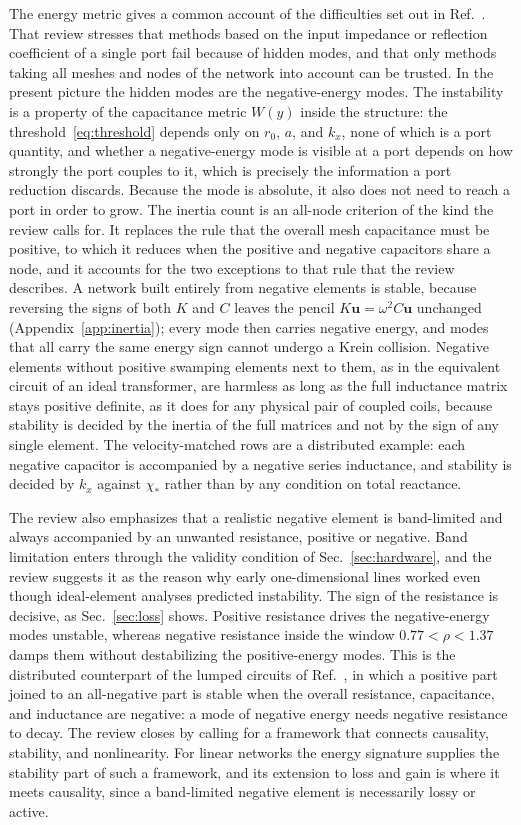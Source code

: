 \documentclass[aps,prapplied,twocolumn,superscriptaddress,floatfix,longbibliography]{revtex4-2}
\begin{document}
The energy metric gives a common account of the difficulties set out in Ref.~\cite{Hrabar_2018:EPJAM}. That review stresses that methods based on the input impedance or reflection coefficient of a single port fail because of hidden modes, and that only methods taking all meshes and nodes of the network into account can be trusted. In the present picture the hidden modes are the negative-energy modes. The instability is a property of the capacitance metric $W(y)$ inside the structure: the threshold~\eqref{eq:threshold} depends only on $r_0$, $a$, and $k_x$, none of which is a port quantity, and whether a negative-energy mode is visible at a port depends on how strongly the port couples to it, which is precisely the information a port reduction discards. Because the mode is absolute, it also does not need to reach a port in order to grow. The inertia count is an all-node criterion of the kind the review calls for. It replaces the rule that the overall mesh capacitance must be positive, to which it reduces when the positive and negative capacitors share a node, and it accounts for the two exceptions to that rule that the review describes. A network built entirely from negative elements is stable, because reversing the signs of both $K$ and $C$ leaves the pencil $K\bm u=\omega^2C\bm u$ unchanged (Appendix~\ref{app:inertia}); every mode then carries negative energy, and modes that all carry the same energy sign cannot undergo a Krein collision. Negative elements without positive swamping elements next to them, as in the equivalent circuit of an ideal transformer, are harmless as long as the full inductance matrix stays positive definite, as it does for any physical pair of coupled coils, because stability is decided by the inertia of the full matrices and not by the sign of any single element. The velocity-matched rows are a distributed example: each negative capacitor is accompanied by a negative series inductance, and stability is decided by $k_x$ against $\chi_*$ rather than by any condition on total reactance.

The review also emphasizes that a realistic negative element is band-limited and always accompanied by an unwanted resistance, positive or negative. Band limitation enters through the validity condition of Sec.~\ref{sec:hardware}, and the review suggests it as the reason why early one-dimensional lines worked even though ideal-element analyses predicted instability. The sign of the resistance is decisive, as Sec.~\ref{sec:loss} shows. Positive resistance drives the negative-energy modes unstable, whereas negative resistance inside the window $0.77<\rho<1.37$ damps them without destabilizing the positive-energy modes. This is the distributed counterpart of the lumped circuits of Ref.~\cite{Hrabar_2018:EPJAM}, in which a positive part joined to an all-negative part is stable when the overall resistance, capacitance, and inductance are negative: a mode of negative energy needs negative resistance to decay. The review closes by calling for a framework that connects causality, stability, and nonlinearity. For linear networks the energy signature supplies the stability part of such a framework, and its extension to loss and gain is where it meets causality, since a band-limited negative element is necessarily lossy or active.
\end{document}
